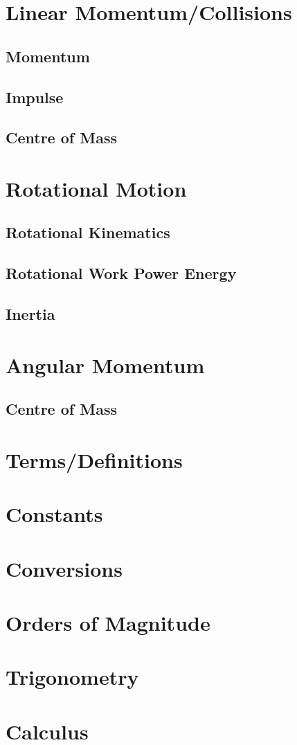 \documentclass[letterpaper]{article}
\begin{document}
\section{Linear Momentum/Collisions}
\subsection{Momentum}
\subsection{Impulse}
\subsection{Centre of Mass}

\section{Rotational Motion}
\subsection{Rotational Kinematics}
\subsection{Rotational Work Power Energy}
\subsection{Inertia}

\section{Angular Momentum}
\subsection{Centre of Mass}

\appendix
\section{Terms/Definitions}

\section{Constants}

\section{Conversions}

\section{Orders of Magnitude}

\section{Trigonometry}

\section{Calculus}
\end{document}
